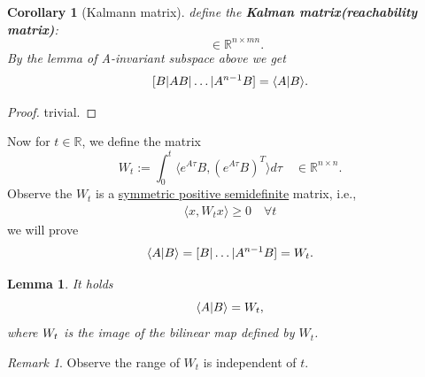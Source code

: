 \documentclass[a4paper,11pt,fleqn]{book}
\newtheorem{corollary}{Corollary}[theorem]
\newtheorem{lemma}[theorem]{Lemma}
\theoremstyle{definition}
\theoremstyle{remark}
\newtheorem*{remark}{Remark}
\let\ran\relax
\DeclareMathOperator{\ran}{ran}
\begin{document}
\begin{corollary}[Kalmann matrix]
	define the \textbf{Kalman matrix(reachability matrix)}:
\begin{equation*}
	[B|AB|A^2B|\dots| A^{n -1}B] \quad \in \mathbb{R}^{n \times mn} .
\end{equation*}	
By the lemma of A-invariant subspace above we get 
\begin{align*}
	\ran [B|AB|\dots|A^{n -1}B] = \langle A| \ran B\rangle. 
\end{align*}
\end{corollary}
\begin{proof}
	trivial.
\end{proof}

Now for $t \in \mathbb{R}$, we define the matrix
\begin{equation}
		W_t := \int_0^t \langle  e^{A\tau} B, (e^{A\tau} B)^T\rangle d\tau \quad \in \mathbb{R}^{n \times n}.
\end{equation}
Observe the $W_t$ is a \underline{symmetric positive semidefinite} matrix, i.e., 
\begin{align*}
	\langle x, W_t x \rangle \ge 0 \quad \forall t 
\end{align*}  we will prove 
\begin{align*}
	\langle A|\ran B \rangle = \ran [B|\dots|A^{n -1}B] = \ran W_t.
\end{align*}


\begin{lemma}
It holds
\begin{equation}
	\langle A| \ran B \rangle = \ran  W_t, 
\end{equation}	
where $\ran W_t$ is the image of the bilinear map defined by $W_t$. 
\end{lemma}
\begin{remark}
Observe the range of $W_t$ is independent of $t$. 	
\end{remark}
\end{document}
